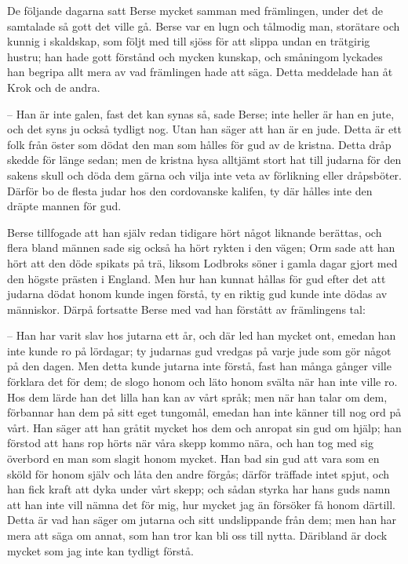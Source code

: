 \initial De följande dagarna satt Berse mycket samman med främlingen, under det de samtalade så gott det ville gå. Berse var en lugn och tålmodig man, storätare och kunnig i skaldskap, som följt med till sjöss för att slippa undan en trätgirig hustru; han hade gott förstånd och mycken kunskap, och småningom lyckades han begripa allt mera av vad främlingen hade att säga. Detta meddelade han åt Krok och de andra.

– Han är inte galen, fast det kan synas så, sade Berse; inte heller är han en jute, och det syns ju också tydligt nog. Utan han säger att han är en jude. Detta är ett folk från öster som dödat den man som hålles för gud av de kristna. Detta dråp skedde för länge sedan; men de kristna hysa alltjämt stort hat till judarna för den sakens skull och döda dem gärna och vilja inte veta av förlikning eller dråpsböter. Därför bo de flesta judar hos den cordovanske kalifen, ty där hålles inte den dräpte mannen för gud.

\initial Berse tillfogade att han själv redan tidigare hört något liknande berättas, och flera bland männen sade sig också ha hört rykten i den vägen; Orm sade att han hört att den döde spikats på trä, liksom Lodbroks söner i gamla dagar gjort med den högste prästen i England. Men hur han kunnat hållas för gud efter det att judarna dödat honom kunde ingen förstå, ty en riktig gud kunde inte dödas av människor. Därpå fortsatte Berse med vad han förstått av främlingens tal:

– Han har varit slav hos jutarna ett år, och där led han mycket ont, emedan han inte kunde ro på lördagar; ty judarnas gud vredgas på varje jude som gör något på den dagen. Men detta kunde jutarna inte förstå, fast han många gånger ville förklara det för dem; de slogo honom och läto honom svälta när han inte ville ro. Hos dem lärde han det lilla han kan av vårt språk; men när han talar om dem, förbannar han dem på sitt eget tungomål, emedan han inte känner till nog ord på vårt. Han säger att han gråtit mycket hos dem och anropat sin gud om hjälp; han förstod att hans rop hörts när våra skepp kommo nära, och han tog med sig överbord en man som slagit honom mycket. Han bad sin gud att vara som en sköld för honom själv och låta den andre förgås; därför träffade intet spjut, och han fick kraft att dyka under vårt skepp; och sådan styrka har hans guds namn att han inte vill nämna det för mig, hur mycket jag än försöker få honom därtill. Detta är vad han säger om jutarna och sitt undslippande från dem; men han har mera att säga om annat, som han tror kan bli oss till nytta. Däribland är dock mycket som jag inte kan tydligt förstå.

